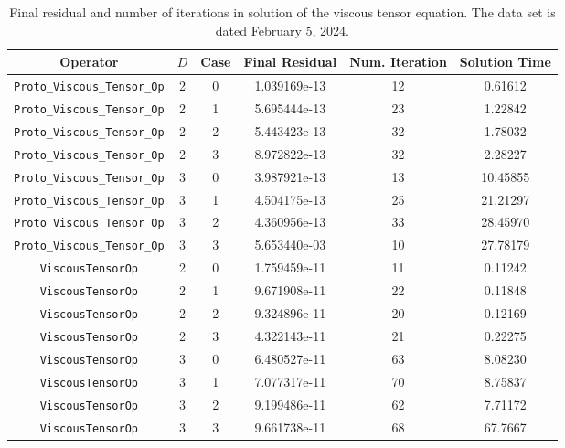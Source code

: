 \documentclass{article}
\begin{document}
\begin{small}
\begin{table}
\begin{center}
\begin{tabular}{|c|c|c|c|c||c|} \hline
 Operator                   & $D$ & Case & Final Residual &
 Num. Iteration & Solution Time\\
\hline
 {\tt Proto\_Viscous\_Tensor\_Op} & 2   & 0    & 1.039169e-13   &         12 & 0.61612\\
 {\tt Proto\_Viscous\_Tensor\_Op} & 2   & 1    & 5.695444e-13   &         23 & 1.22842\\
 {\tt Proto\_Viscous\_Tensor\_Op} & 2   & 2    & 5.443423e-13   &         32 & 1.78032\\
 {\tt Proto\_Viscous\_Tensor\_Op} & 2   & 3    & 8.972822e-13   &         32 & 2.28227\\
 {\tt Proto\_Viscous\_Tensor\_Op} & 3   & 0    & 3.987921e-13   &         13 & 10.45855\\
 {\tt Proto\_Viscous\_Tensor\_Op} & 3   & 1    & 4.504175e-13   &         25 & 21.21297\\
 {\tt Proto\_Viscous\_Tensor\_Op} & 3   & 2    & 4.360956e-13   &         33 & 28.45970\\
 {\tt Proto\_Viscous\_Tensor\_Op} & 3   & 3    & 5.653440e-03   &         10 & 27.78179\\
\hline                                                                        
 {\tt ViscousTensorOp}            & 2   & 0    & 1.759459e-11   &         11 & 0.11242 \\
 {\tt ViscousTensorOp}            & 2   & 1    & 9.671908e-11   &         22 & 0.11848 \\
 {\tt ViscousTensorOp}            & 2   & 2    & 9.324896e-11   &         20 & 0.12169 \\
 {\tt ViscousTensorOp}            & 2   & 3    & 4.322143e-11   &         21 & 0.22275 \\
 {\tt ViscousTensorOp}            & 3   & 0    & 6.480527e-11   &         63 & 8.08230 \\
 {\tt ViscousTensorOp}            & 3   & 1    & 7.077317e-11   &         70 & 8.75837 \\
 {\tt ViscousTensorOp}            & 3   & 2    & 9.199486e-11   &         62 & 7.71172 \\
 {\tt ViscousTensorOp}            & 3   & 3    & 9.661738e-11   &         68 & 67.7667\\
\hline
\end{tabular}
\end{center}
\label{tab::viscous1}
\caption
    {
      Final residual and number of iterations in solution of the
      viscous tensor equation.
      The data set is dated February 5, 2024.
    }
\end{table}
\end{small}
\end{document}

